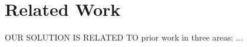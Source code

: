 \chapter{Related Work}{}
\label{sec:related}

\lettrine[lraise=0.1, nindent=0em, slope=-.5em]{O} {UR SOLUTION IS RELATED TO} prior work in three areas: $\ldots$
